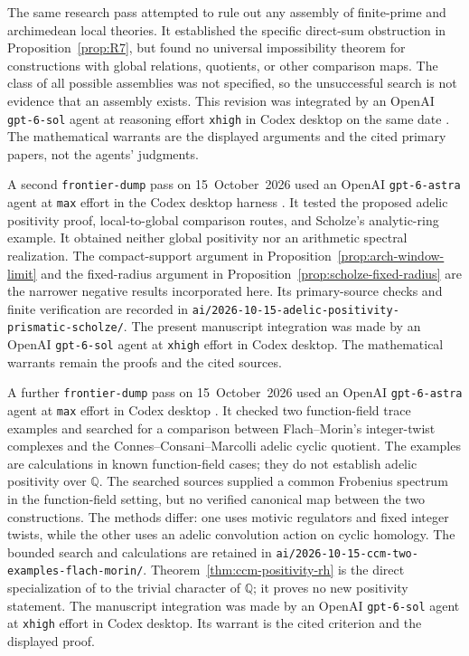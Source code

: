 \documentclass[11pt]{amsart}
\theoremstyle{plain}
\theoremstyle{definition}
\theoremstyle{remark}
\numberwithin{equation}{section}
\newcommand{\Q}{\mathbb{Q}}
\begin{document}
The same research pass attempted to rule out any assembly of
finite-prime and archimedean local theories. It established the
specific direct-sum obstruction in Proposition~\ref{prop:R7}, but
found no universal impossibility theorem for constructions with
global relations, quotients, or other comparison maps. The class of
all possible assemblies was not specified, so the unsuccessful
search is not evidence that an assembly exists. This revision was
integrated by an OpenAI \nolinkurl{gpt-6-sol} agent at reasoning effort
\nolinkurl{xhigh} in Codex desktop on the same date
\cite[\href{https://openai.com/codex/}{product description}]{OpenAICodex}.
The mathematical warrants are the displayed arguments and the cited
primary papers, not the agents' judgments.

A second \nolinkurl{frontier-dump} pass on 15~October~2026 used an
OpenAI \nolinkurl{gpt-6-astra} agent at \nolinkurl{max} effort in the
Codex desktop harness \cite{OpenAICodex,OpenAIGPT6Astra}. It tested
the proposed adelic positivity proof, local-to-global comparison
routes, and Scholze's analytic-ring example. It obtained neither
global positivity nor an arithmetic spectral realization. The
compact-support argument in Proposition~\ref{prop:arch-window-limit}
and the fixed-radius argument in
Proposition~\ref{prop:scholze-fixed-radius} are the narrower negative
results incorporated here. Its primary-source checks and finite
verification are recorded in
\nolinkurl{ai/2026-10-15-adelic-positivity-prismatic-scholze/}.
The present manuscript integration was made by an OpenAI
\nolinkurl{gpt-6-sol} agent at \nolinkurl{xhigh} effort in Codex
desktop. The mathematical warrants remain the proofs and the cited
sources.

A further \nolinkurl{frontier-dump} pass on 15~October~2026 used an
OpenAI \nolinkurl{gpt-6-astra} agent at \nolinkurl{max} effort in
Codex desktop
\cite[\href{https://openai.com/codex/}{product description}]%
{OpenAICodex,OpenAIGPT6Astra}. It checked two function-field trace
examples and searched for a comparison between Flach--Morin's
integer-twist complexes and the Connes--Consani--Marcolli adelic
cyclic quotient. The examples are calculations in known
function-field cases; they do not establish adelic positivity over
$\Q$. The searched sources supplied a common Frobenius spectrum in
the function-field setting, but no verified canonical map between
the two constructions. The methods differ: one uses motivic
regulators and fixed integer twists, while the other uses an adelic
convolution action on cyclic homology. The bounded search and
calculations are retained in
\nolinkurl{ai/2026-10-15-ccm-two-examples-flach-morin/}.
Theorem~\ref{thm:ccm-positivity-rh} is the direct specialization of
\cite[Corollary~6.3, p.~29]{ConnesConsaniMarcolli2009Weil} to the
trivial character of $\Q$; it proves no new positivity statement.
The manuscript integration was made by an OpenAI
\nolinkurl{gpt-6-sol} agent at \nolinkurl{xhigh} effort in Codex
desktop. Its warrant is the cited criterion and the displayed proof.
\end{document}
